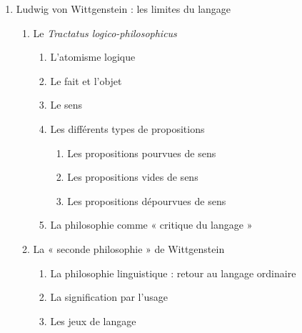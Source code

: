 \begin{keybox}
\begin{enumerate}[label=\arabic*.]
\begin{enumerate}[label=\textcircled{\scriptsize\arabic*}]
\item Le paradoxe de Russel
\begin{enumerate}[label=\arabic*.]
\item Formulation du paradoxe
\item La théorie des types
\end{enumerate}
\item \textit{On denoting} (1905)
\begin{enumerate}[label=\arabic*.]
\item « Le roi de France est chauve. »
\item La résolution de l’énigme
\end{enumerate}
\item Russell et Oswald Ducrot : Posé, présupposé et sous-entendu
\item Russell et Gongsun Long : 白马非马
\item Russell et Zhuangzi : 鱼之乐
\end{enumerate}
\item Ludwig von Wittgenstein : les limites du langage
\begin{enumerate}[label=\textcircled{\scriptsize\arabic*}]
\item Le \textit{Tractatus logico-philosophicus}
\begin{enumerate}[label=\arabic*.]
\item L’atomisme logique
\item Le fait et l’objet
\item Le sens
\item Les différents types de propositions
\begin{enumerate}[label=\arabic*)]
\item Les propositions pourvues de sens
\item Les propositions vides de sens
\item Les propositions dépourvues de sens
\end{enumerate}
\item La philosophie comme « critique du langage »
\end{enumerate}
\item La « seconde philosophie » de Wittgenstein
\begin{enumerate}[label=\arabic*.]
\item La philosophie linguistique : retour au langage ordinaire
\item La signification par l’usage
\item Les jeux de langage
\end{enumerate}

\end{enumerate}
\end{enumerate}
\end{keybox}
